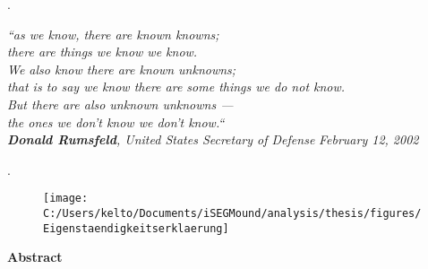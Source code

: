 \documentclass[
  12pt,
]{article}
\begin{document}
\newpage
\allsectionsfont{\centering}
\subsectionfont{\raggedright}
\subsubsectionfont{\raggedright}

\begin{centering}

\vspace*{\fill}

\begingroup.

{\emph {“as we know, there are known knowns;\\ 
there are things we know we know.\\
We also know there are known unknowns; \\
that is to say we know there are some things we do not know. \\
But there are also unknown unknowns — \\
the ones we don't know we don't know.“}} \\ 
\vspace{0.25 cm}
\emph{\textbf{Donald Rumsfeld}, United States Secretary of Defense} \emph{February 12, 2002}

\endgroup.

\vspace*{\fill}

\end{centering}

\newpage


\begin{figure}

{\centering \texttt{[image: C:/Users/kelto/Documents/iSEGMound/analysis/thesis/figures/Eigenstaendigkeitserklaerung]} 

}

\end{figure}

\newpage
\vspace{1 cm}
\begin{centering}

\bf Abstract

\end{centering}

\vspace{1 cm}
\end{document}
